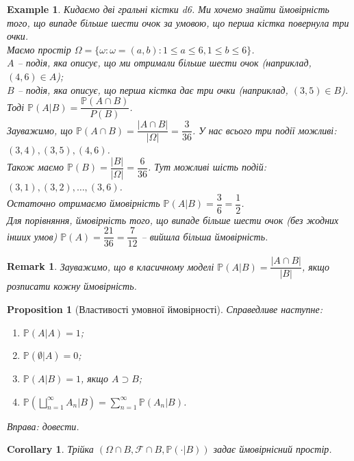 \documentclass[a4paper, 10pt]{article}
\theoremstyle{theoremdd}
\newtheorem{example}[theorem]{Example}
\newtheorem{proposition}[theorem]{Proposition}
\newtheorem{remark}[theorem]{Remark}
\newtheorem{corollary}[theorem]{Corollary}
\begin{document}
\begin{example}
Кидаємо дві гральні кістки d6. Ми хочемо знайти ймовірність того, що випаде більше шести очок за умовою, що перша кістка повернула три очки.\\
Маємо простір $\Omega = \{ \omega: \omega = (a,b): 1 \leq a \leq 6, 1 \leq b \leq 6\}$.\\
$A$ -- подія, яка описує, що ми отримали більше шести очок (наприклад, $(4,6) \in A$);\\
$B$ -- подія, яка описує, що перша кістка дає три очки (наприклад, $(3,5) \in B$).\\
Тоді $\mathbb{P}(A|B) = \dfrac{\mathbb{P}(A \cap B)}{P(B)}$.\\
Зауважимо, що $\mathbb{P}(A \cap B) = \dfrac{|A \cap B|}{|\Omega|} = \dfrac{3}{36}$. У нас всього три події можливі: $(3,4),(3,5),(4,6)$.\\
Також маємо $\mathbb{P}(B) = \dfrac{|B|}{|\Omega|} = \dfrac{6}{36}$. Тут можливі шість подій: $(3,1), (3,2), \dots, (3,6)$.\\
Остаточно отримаємо ймовірність $\mathbb{P}(A|B) = \dfrac{3}{6} = \dfrac{1}{2}$.\\
Для порівняння, ймовірність того, що випаде більше шести очок (без жодних інших умов) $\mathbb{P}(A) = \dfrac{21}{36} = \dfrac{7}{12}$ -- вийшла більша ймовірність.
\end{example}

\begin{remark}
Зауважимо, що в класичному моделі $\mathbb{P}(A|B) = \dfrac{|A \cap B|}{|B|}$, якщо розписати кожну ймовірність.
\end{remark}

\begin{proposition}[Властивості умовної ймовірності]
Справедливе наступне:
\begin{enumerate}[nosep,wide=0pt,label={\arabic*)}]
\item $\mathbb{P}(A|A) = 1$;
\item $\mathbb{P}(\emptyset|A) = 0$;
\item $\mathbb{P}(A|B) = 1$, якщо $A \supset B$;
\item $\displaystyle \mathbb{P}\left(\bigsqcup_{n=1}^\infty A_n | B\right) = \sum_{n=1}^\infty \mathbb{P}(A_n | B)$.
\end{enumerate}
\textit{Вправа: довести.}
\end{proposition}

\begin{corollary}
Трійка $(\Omega \cap B, \mathcal{F} \cap B, \mathbb{P}(\cdot | B))$ задає ймовірнісний простір.
\end{corollary}
\end{document}
